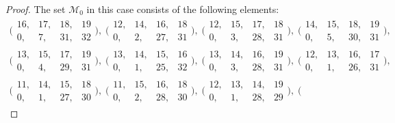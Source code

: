 \documentclass[a4paper,twoside]{article}
\numberwithin{equation}{section}
\renewcommand{\[}{\lfloor}
\renewcommand{\]}{\rfloor}
\newcommand{\<}{\langle}
\renewcommand{\>}{\rangle}
\newcommand{\sM}{\mathcal M}
\begin{document}
\begin{proof}
The set $\sM_0$ in this case consists of the following elements:
\begin{gather*}
\biggl(\begin{array}{rrrr}
16, & 17, & 18, & 19 \\0, & 7, & 31, & 32
\end{array}\biggr),
\;
\biggl(\begin{array}{rrrr}
12, & 14, & 16, & 18 \\ 0, & 2, & 27, & 31
\end{array}\biggr),
\;
\biggl(\begin{array}{rrrr}
12, & 15, & 17, & 18 \\ 0, & 3, & 28, & 31
\end{array}\biggr),
\;
\biggl(\begin{array}{rrrr}
14, & 15, & 18, & 19 \\ 0, & 5, & 30, & 31
\end{array}\biggr),
\\
\biggl(\begin{array}{rrrr}
13, & 15, & 17, & 19 \\ 0, & 4, & 29, & 31
\end{array}\biggr),
\;
\biggl(\begin{array}{rrrr}
13, & 14, & 15, & 16 \\ 0, & 1, & 25, & 32
\end{array}\biggr),
\;
\biggl(\begin{array}{rrrr}
13, & 14, & 16, & 19 \\ 0, & 3, & 28, & 31
\end{array}\biggr),
\;
\biggl(\begin{array}{rrrr}
12, & 13, & 16, & 17 \\ 0, & 1, & 26, & 31
\end{array}\biggr),
\\
\biggl(\begin{array}{rrrr}
11, & 14, & 15, & 18 \\ 0, & 1, & 27, & 30
\end{array}\biggr),
\;
\biggl(\begin{array}{rrrr}
11, & 15, & 16, & 18 \\ 0, & 2, & 28, & 30
\end{array}\biggr),
\;
\biggl(\begin{array}{rrrr}
12, & 13, & 14, & 19 \\ 0, & 1, & 28, & 29
\end{array}\biggr),
\;
\biggl(\begin{array}{rrrr}

\end{array}
\end{gather*}
\end{proof}
\end{document}
